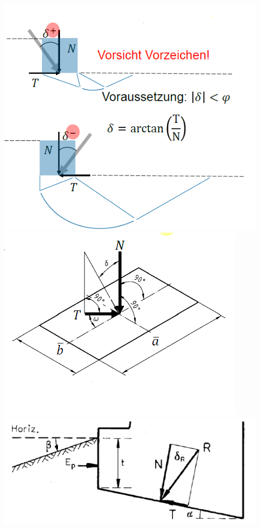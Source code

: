 \begin{minipage}{0.2\linewidth}
	
	\includegraphics[width=\linewidth]{images/Flachfun2Vorz.PNG} \\
	
	\includegraphics[width=\linewidth]{images/Flachfun2Winkel.PNG} \\
	
	\includegraphics[width=\linewidth]{images/Flachfun3Neig.PNG} \\
	

\end{minipage}
